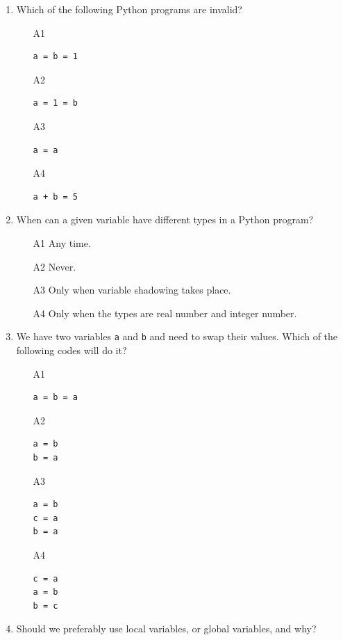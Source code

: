 \begin{enumerate}
\item Which of the following Python programs are invalid?
\begin{enumerate}
\item[A1] 
\begin{verbatim}
a = b = 1
\end{verbatim}
\item[A2] 
\begin{verbatim}
a = 1 = b
\end{verbatim}
\item[A3] 
\begin{verbatim}
a = a
\end{verbatim}
\item[A4] 
\begin{verbatim}
a + b = 5
\end{verbatim}
\end{enumerate}
\item When can a given variable have different types in a Python program?
\begin{enumerate}
\item[A1] Any time.
\item[A2] Never.
\item[A3] Only when variable shadowing takes place.
\item[A4] Only when the types are real number and integer number.
\end{enumerate}
\item We have two variables {\tt a} and {\tt b} and need to swap their values. Which of the 
following codes will do it?
\begin{enumerate}
\item[A1] 
\begin{verbatim}
a = b = a
\end{verbatim}
\item[A2] 
\begin{verbatim}
a = b
b = a
\end{verbatim}
\item[A3] 
\begin{verbatim}
a = b
c = a
b = a
\end{verbatim}
\item[A4] 
\begin{verbatim}
c = a
a = b
b = c
\end{verbatim}
\end{enumerate}
\item Should we preferably use local variables, or global variables, and why?

\end{enumerate}
